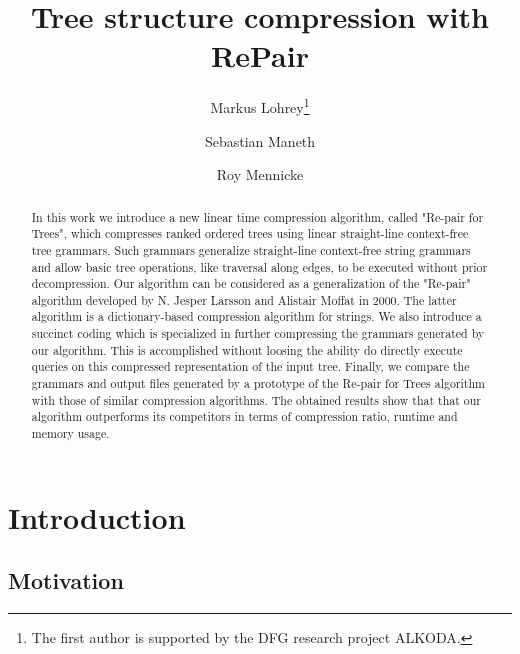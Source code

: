 \documentclass[12pt]{llncs}
\begin{document}
\title{Tree structure compression with RePair}
\author{Markus Lohrey\thanks{The first author 
is supported by the DFG  research project ALKODA.} 
\and Sebastian Maneth \and  Roy Mennicke
}

\maketitle

\begin{abstract}
In this work we introduce a new linear time compression algorithm,
called "Re-pair for Trees", which compresses ranked ordered trees
using linear straight-line context-free tree grammars. Such grammars
generalize straight-line context-free string grammars and allow basic
tree operations, like traversal along edges, to be executed without
prior decompression. Our algorithm can be considered as a
generalization of the "Re-pair" algorithm developed by N. Jesper
Larsson and Alistair Moffat in 2000. The latter 
algorithm is a dictionary-based compression algorithm for strings. 
We also introduce a succinct coding which is specialized in further
compressing the grammars generated by our algorithm. This is
accomplished without loosing the ability do directly execute queries
on this compressed representation of the input tree. Finally, we
compare the grammars and output files generated by a prototype of the
Re-pair for Trees algorithm with those of similar compression
algorithms. The obtained results show that that 
our algorithm outperforms its competitors 
in terms of compression ratio, runtime and memory usage.
\end{abstract}



\section{Introduction}

\subsection{Motivation}
\end{document}
